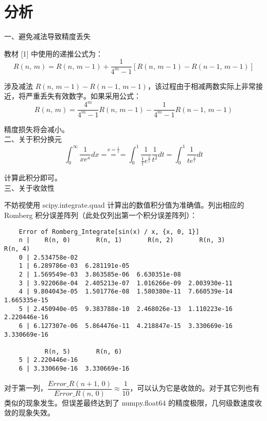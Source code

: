 \documentclass{ctexart}
\begin{document}
\section*{分析}
	\noindent 一、避免减法导致精度丢失
	
	教材 [1] 中使用的递推公式为：
	\begin{equation}
		R(n,\,m) = R(n,\,m - 1) + \dfrac{1}{4^m - 1}\left[R(n,\,m - 1) - R(n - 1,\,m - 1)\right]
	\end{equation}
	
	涉及减法 $R(n,\,m - 1) - R(n - 1,\,m - 1)$，该过程由于相减两数实际上非常接近，将严重丢失有效数字。如果采用公式：
	\begin{equation}
		R(n,\,m) = \dfrac{4^m}{4^m - 1} R(n,\,m - 1) - \dfrac{1}{4^m - 1} R(n - 1,\,m - 1)
	\end{equation}
	
	精度损失将会减小。\\[1cm]
	
	\noindent 二、关于积分换元
	\begin{equation}
		\int_0^\infty \dfrac{1}{x e^x} dx \overset{x = \frac{1}{t}}{===} \int_0^1 \dfrac{1}{\frac{1}{t} e^{\frac{1}{t}}} \dfrac{1}{t^2}dt = \int_0^1 \dfrac{1}{t e^{\frac{1}{t}}} dt
	\end{equation}
		
	计算此积分即可。\\[1cm]
		
	\noindent 三、关于收敛性
	
	不妨视使用 scipy.integrate.quad 计算出的数值积分值为准确值。列出相应的 Romberg 积分误差阵列（此处仅列出第一个积分误差阵列）：
\begin{verbatim}
	Error of Romberg_Integrate[sin(x) / x, {x, 0, 1}]
	n |    R(n, 0)       R(n, 1)       R(n, 2)       R(n, 3)       R(n, 4)       
	0 | 2.534758e-02 
	1 | 6.289786e-03  6.281191e-05 
	2 | 1.569549e-03  3.863585e-06  6.630351e-08 
	3 | 3.922068e-04  2.405213e-07  1.016266e-09  2.003930e-11 
	4 | 9.804043e-05  1.501776e-08  1.580380e-11  7.660539e-14  1.665335e-15 
	5 | 2.450940e-05  9.383788e-10  2.468026e-13  1.110223e-16  2.220446e-16  
	6 | 6.127307e-06  5.864476e-11  4.218847e-15  3.330669e-16  3.330669e-16  
	
	       R(n, 5)       R(n, 6)
	5 | 2.220446e-16
	6 | 3.330669e-16  3.330669e-16
\end{verbatim}

	对于第一列，$\dfrac{Error\_R(n + 1,\,0)}{Error\_R(n,\,0)} \approx \dfrac{1}{10}$，可以认为它是收敛的。对于其它列也有类似的现象发生。但误差最终达到了 numpy.float64 的精度极限，几何级数速度收敛的现象失效。
	
\end{document}
